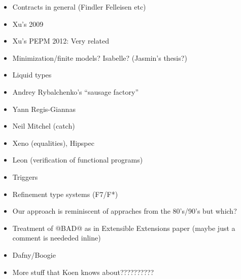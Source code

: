 \begin{itemize}
  \item Contracts in general (Findler Felleisen etc)
  \item Xu's 2009
  \item Xu's PEPM 2012: Very related
  \item Minimization/finite models? Isabelle? (Jasmin's thesis?)
  \item Liquid types 
  \item Andrey Rybalchenko's ``sausage factory''
  \item Yann Regis-Giannas 
  \item Neil Mitchel (catch)
  \item Xeno (equalities), Hipspec 
  \item Leon (verification of functional programs)
  \item Triggers
  \item Refinement type systems (F7/F*)
  \item Our approach is reminiscent of appraches from the 80's/90's but which?
  \item Treatment of @BAD@ as in Extensible Extensions paper (maybe just a comment is neededed inline)
  \item Dafny/Boogie
  \item More stuff that Koen knows about??????????
\end{itemize}
